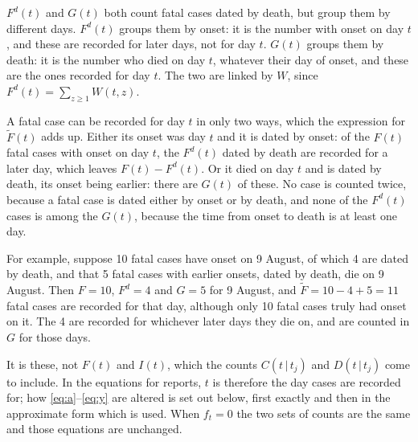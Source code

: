 \documentclass[11pt,a4paper]{article}
\newcommand{\given}{\,|\,}
\begin{document}
$F^{d}(t)$ and $G(t)$ both count fatal cases dated by death, but group them by
different days. $F^{d}(t)$ groups them by onset: it is the number with onset on
day $t$, and these are recorded for later days, not for day $t$. $G(t)$
groups them by death: it is the number who died on day $t$, whatever their
day of onset, and these are the ones recorded for day $t$. The two are linked
by $W$, since $F^{d}(t)=\sum_{z\geq 1}W(t,z)$.

A fatal case can be recorded for day $t$ in only two ways, which the
expression for $\tilde{F}(t)$ adds up. Either its onset was day $t$ and it
is dated by onset: of the $F(t)$ fatal cases with onset on day $t$, the
$F^{d}(t)$ dated by death are recorded for a later day, which leaves
$F(t)-F^{d}(t)$. Or it died on day $t$ and is dated by death, its onset being
earlier: there are $G(t)$ of these. No case is counted twice, because a
fatal case is dated either by onset or by death, and none of the $F^{d}(t)$
cases is among the $G(t)$, because the time from onset to death is at least
one day.

For example, suppose 10 fatal cases have onset on 9 August, of which 4 are
dated by death, and that 5 fatal cases with earlier onsets, dated by death,
die on 9 August. Then $F=10$, $F^{d}=4$ and $G=5$ for 9 August, and
$\tilde{F}=10-4+5=11$ fatal cases are recorded for that day, although only
10 fatal cases truly had onset on it. The 4 are recorded for whichever later
days they die on, and are counted in $G$ for those days.

It is
these, not $F(t)$ and $I(t)$, which the counts $C(t\given t_j)$ and
$D(t\given t_j)$ come to include. In the equations for reports, $t$ is therefore the day cases are recorded
for; how \eqref{eq:a}--\eqref{eq:y} are altered is set out below, first
exactly and then in the approximate form which is used. When $f_t=0$ the two
sets of counts are the same and those equations are unchanged.
\end{document}
